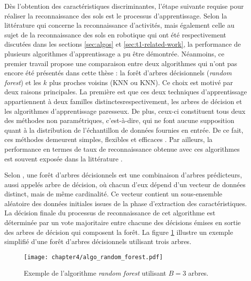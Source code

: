 Dès l'obtention des caractéristiques discriminantes, l'étape suivante requise pour réaliser la reconnaissance des sols est le processus d'apprentissage. Selon la littérature qui concerne la reconnaissance d'activités, mais également celle au sujet de la reconnaissance des sols en robotique qui ont été respectivement discutées dans les sections \ref{sec:algos} et \ref{sec:t1-related-work}, la performance de plusieurs algorithmes d'apprentissage a pu être démontrée. Néanmoins, ce premier travail propose une comparaison entre deux algorithmes qui n'ont pas encore été présentés dans cette thèse : la forêt d'arbres décisionnels (\textit{random forest}) et les $k$ plus proches voisins (\acl{KNN} ou \acs{KNN}). Ce choix est motivé par deux raisons principales. La première est que ces deux techniques d'apprentissage appartiennent à deux familles distinctes\textemdash respectivement, les arbres de décision et les algorithmes d'apprentissage \og{}paresseux\fg{}. De plus, ceux-ci constituent tous deux des méthodes non paramétriques, c'est-à-dire, qui ne font aucune supposition quant à la distribution de l'échantillon de données fournies en entrée. De ce fait, ces méthodes demeurent simples, flexibles et efficaces \citep{Russell2010}. Par ailleurs, la performance en termes de taux de reconnaissance obtenue avec ces algorithmes est souvent exposée dans la littérature \citep{Kertesz2016, Vail2004}.

Selon \cite{Breiman2001}, une forêt d'arbres décisionnels est une combinaison d'arbres prédicteurs, aussi appelés arbre de décision, où chacun d'eux dépend d'un vecteur de données distinct, mais de même cardinalité. Ce vecteur contient un sous-ensemble aléatoire des données initiales issues de la phase d'extraction des caractéristiques. La décision finale du processus de reconnaissance de cet algorithme est déterminée par un vote majoritaire entre chacune des décisions émises en sortie des arbres de décision qui composent la forêt. La figure \ref{fig:algo_random_forest} illustre un exemple simplifié d'une forêt d'arbres décisionnels utilisant trois arbres.

\begin{figure}[H]
	\centering
	\texttt{[image: chapter4/algo\_random\_forest.pdf]}
        \caption{Exemple de l'algorithme \textit{random forest} utilisant $B=3$ arbres.}
	\label{fig:algo_random_forest}
\end{figure}

